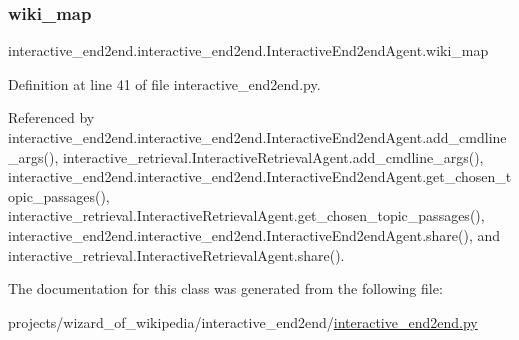 \mbox{\label{classinteractive__end2end_1_1interactive__end2end_1_1InteractiveEnd2endAgent_a4d34c25f00a82a908fa45507996f1824}} 
\subsubsection{\texorpdfstring{wiki\+\_\+map}{wiki\_map}}
{\footnotesize\ttfamily interactive\+\_\+end2end.\+interactive\+\_\+end2end.\+Interactive\+End2end\+Agent.\+wiki\+\_\+map}



Definition at line 41 of file interactive\+\_\+end2end.\+py.



Referenced by interactive\+\_\+end2end.\+interactive\+\_\+end2end.\+Interactive\+End2end\+Agent.\+add\+\_\+cmdline\+\_\+args(), interactive\+\_\+retrieval.\+Interactive\+Retrieval\+Agent.\+add\+\_\+cmdline\+\_\+args(), interactive\+\_\+end2end.\+interactive\+\_\+end2end.\+Interactive\+End2end\+Agent.\+get\+\_\+chosen\+\_\+topic\+\_\+passages(), interactive\+\_\+retrieval.\+Interactive\+Retrieval\+Agent.\+get\+\_\+chosen\+\_\+topic\+\_\+passages(), interactive\+\_\+end2end.\+interactive\+\_\+end2end.\+Interactive\+End2end\+Agent.\+share(), and interactive\+\_\+retrieval.\+Interactive\+Retrieval\+Agent.\+share().



The documentation for this class was generated from the following file\+:\begin{DoxyCompactItemize}
\item 
projects/wizard\+\_\+of\+\_\+wikipedia/interactive\+\_\+end2end/\hyperlink{interactive__end2end_8py}{interactive\+\_\+end2end.\+py}\end{DoxyCompactItemize}

